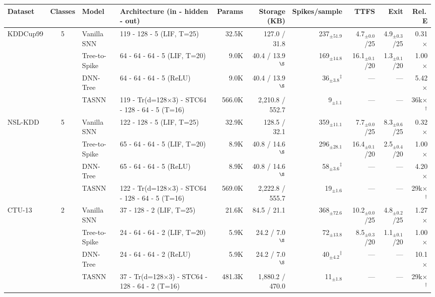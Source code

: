 \begin{table}[!ht]
\label{tab:architecture_general}
{\scriptsize
\begin{tabular}{l c l l r r r r r r}
\toprule
\textbf{Dataset} & \textbf{Classes} & \textbf{Model} & \textbf{Architecture (in - hidden - out)} & \textbf{Params} & \textbf{Storage (KB)} & \textbf{Spikes/sample} & \textbf{TTFS} & \textbf{Exit} & \textbf{Rel.\,E} \\
\midrule
\multirow{4}{*}{KDDCup99} & \multirow{4}{*}{5}
  & Vanilla SNN   & 119 - 128 - 5 (LIF, T=25) & 32.5K & 127.0 / 31.8 & 237$_{\pm51.9}$ & 4.7$_{\pm0.0}$/25 & 4.9$_{\pm0.3}$/25 & 0.31$\times$ \\
& & Tree-to-Spike & 64 - 64 - 64 - 5 (LIF, T=20) & 9.0K & 40.4 / 13.9$^{\S}$ & 169$_{\pm14.8}$ & 16.1$_{\pm0.1}$/20 & 1.3$_{\pm0.1}$/20 & 1.00$\times$ \\
& & DNN-Tree      & 64 - 64 - 64 - 5 (ReLU) & 9.0K & 40.4 / 13.9$^{\S}$ & 36$_{\pm3.8}$$^\ddagger$ & --- & --- & 5.42$\times$ \\
& & TASNN         & 119 - Tr(d=128$\times$3) - STC64 - 128 - 64 - 5 (T=16) & 566.0K & 2,210.8 / 552.7 & 9$_{\pm1.1}$ & --- & --- & 36k$\times$$^\dagger$ \\
\midrule
\multirow{4}{*}{NSL-KDD} & \multirow{4}{*}{5}
  & Vanilla SNN   & 122 - 128 - 5 (LIF, T=25) & 32.9K & 128.5 / 32.1 & 359$_{\pm11.1}$ & 7.7$_{\pm0.0}$/25 & 8.3$_{\pm0.6}$/25 & 0.32$\times$ \\
& & Tree-to-Spike & 65 - 64 - 64 - 5 (LIF, T=20) & 8.9K & 40.8 / 14.6$^{\S}$ & 296$_{\pm28.1}$ & 16.4$_{\pm0.1}$/20 & 2.5$_{\pm0.4}$/20 & 1.00$\times$ \\
& & DNN-Tree      & 65 - 64 - 64 - 5 (ReLU) & 8.9K & 40.8 / 14.6$^{\S}$ & 58$_{\pm3.6}$$^\ddagger$ & --- & --- & 4.20$\times$ \\
& & TASNN         & 122 - Tr(d=128$\times$3) - STC64 - 128 - 64 - 5 (T=16) & 569.0K & 2,222.8 / 555.7 & 19$_{\pm1.6}$ & --- & --- & 29k$\times$$^\dagger$ \\
\midrule
\multirow{4}{*}{CTU-13} & \multirow{4}{*}{2}
  & Vanilla SNN   & 37 - 128 - 2 (LIF, T=25) & 21.6K & 84.5 / 21.1 & 368$_{\pm72.6}$ & 10.2$_{\pm0.0}$/25 & 4.8$_{\pm0.2}$/25 & 1.27$\times$ \\
& & Tree-to-Spike & 24 - 64 - 64 - 2 (LIF, T=20) & 5.9K & 24.2 / 7.0$^{\S}$ & 72$_{\pm13.8}$ & 8.5$_{\pm0.3}$/20 & 1.1$_{\pm0.1}$/20 & 1.00$\times$ \\
& & DNN-Tree      & 24 - 64 - 64 - 2 (ReLU) & 5.9K & 24.2 / 7.0$^{\S}$ & 40$_{\pm4.2}$$^\ddagger$ & --- & --- & 10.1$\times$ \\
& & TASNN         & 37 - Tr(d=128$\times$3) - STC64 - 128 - 64 - 2 (T=16) & 481.3K & 1,880.2 / 470.0 & 11$_{\pm1.8}$ & --- & --- & 29k$\times$$^\dagger$ \\

\end{tabular}}
\end{table}
